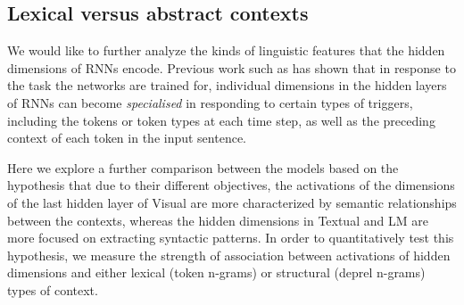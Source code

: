 %
%
%
%
\subsection{Lexical versus abstract contexts}
\label{sec:contexts}

We would like to further analyze the kinds of linguistic features that the
hidden dimensions of RNNs encode. Previous work such as 
 has shown that in response 
to the task the networks are trained for, individual dimensions in the hidden layers of 
RNNs can become {\it specialised} in responding to certain types of triggers, including 
the tokens or token types at each time step, as well as the preceding context of
each token in the input sentence.

Here we explore a further comparison between the models based on the hypothesis 
that due to their different objectives, the activations of the dimensions of the last 
hidden layer of {\sc Visual} are more characterized by semantic relationships between 
the contexts, whereas the hidden dimensions in {\sc Textual} and {\sc LM} are 
more focused on extracting syntactic patterns. In order to quantitatively test this 
hypothesis, we measure the strength of association between activations of hidden 
dimensions and either lexical (token n-grams) or structural (deprel n-grams) types 
of context. 


